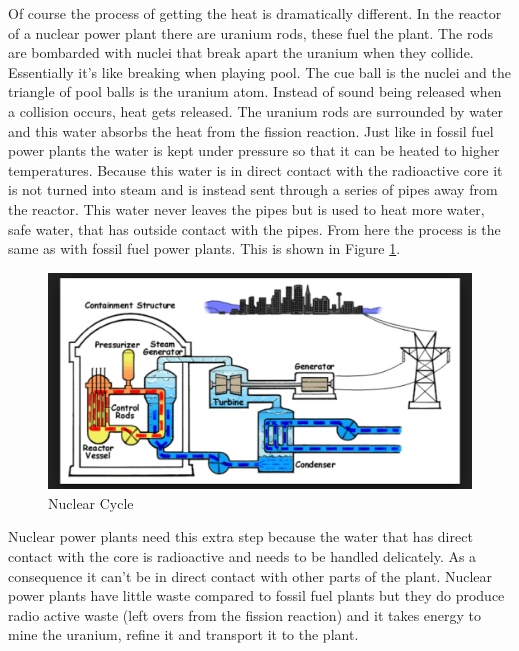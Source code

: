 \documentclass[msc,oneside]{ubcthesis}%
\begin{document}
Of course the process of getting the heat is dramatically different. In the reactor of a nuclear power 
plant there are uranium rods, these fuel the plant. The rods are bombarded with nuclei that break apart the 
uranium when they collide. Essentially it's like breaking when playing pool. The cue ball is the nuclei and 
the triangle of pool balls is the uranium atom. Instead of sound being released when a collision occurs, 
heat gets released. The uranium rods are surrounded by water and this water absorbs the heat from the 
fission reaction. Just like in fossil fuel power plants the water is kept under pressure so that it can be 
heated to higher temperatures. Because this water is in direct contact with the radioactive core it is not 
turned into steam and is instead sent through a series of pipes away from the reactor. This water never 
leaves the pipes but is used to heat more water, safe water, that has outside contact with the pipes. From 
here the process is the same as with fossil fuel power plants. This is shown in Figure \ref{nuclearCycle}.

\begin{figure}[hbt]\label{nuclearCycle}
  \begin{center}
    \includegraphics[width=1\textwidth]{nuclear}
    \caption[Nuclear Cycle]{Nuclear Cycle }
  \end{center}
\end{figure}

Nuclear power plants need this extra step because the water that has direct contact with the core is 
radioactive and needs to be handled delicately. As a consequence it can't be in direct contact with other 
parts of the plant. Nuclear power plants have little waste compared to fossil fuel plants but they do 
produce radio active waste (left overs from the fission reaction) and it takes energy to mine the uranium, 
refine it and transport it to the plant.
\end{document}
